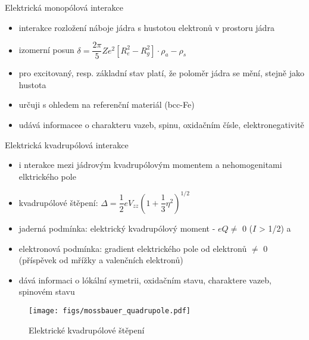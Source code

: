 \vspace{1 cm}

Elektrická monopólová interakce 
\begin{itemize}
\item interakce rozložení náboje jádra s hustotou elektronů v prostoru jádra 
\item izomerní posun $\delta = \dfrac{2\pi}{5} Ze^2 [R_e^2 - R_g^2] \cdot {\rho_a - \rho_s}$
\item pro excitovaný, resp. základní stav platí, že poloměr jádra se mění, stejně jako hustota
\item určuji s ohledem na referenční materiál (bcc-Fe)
\item udává informacee o charakteru vazeb, spinu, oxidačním čísle, elektronegativitě
\end{itemize}

\vspace{1 cm}
Elektrická kvadrupólová interakce
\begin{itemize}

\item i nterakce mezi jádrovým kvadrupólovým momentem a nehomogenitami elktrického pole
\item kvadrupólové štěpení: $\Delta = \dfrac{1}{2} eV_{zz} (1+\dfrac{1}{3}\eta^2)^{1/2}$ \\
\item jaderná podmínka: elektrický kvadrupólový moment - $eQ \neq$ 0 ($I$ > 1/2) a 
\item elektronová podmínka: gradient elektrického pole od elektronů $\neq$ 0 (příspěvek od mřížky a valenčních elektronů)
\item dává informaci o lókální symetrii, oxidačním stavu, charaktere vazeb, spinovém stavu



\end{itemize}
\begin{figure}[ht!]
   \centering
   \texttt{[image: figs/mossbauer\_quadrupole.pdf]}
   \caption{Elektrické kvadrupólové štěpení}
   \label{fig:6_2_mossbauer_electric_quadrupole}
\end{figure}




